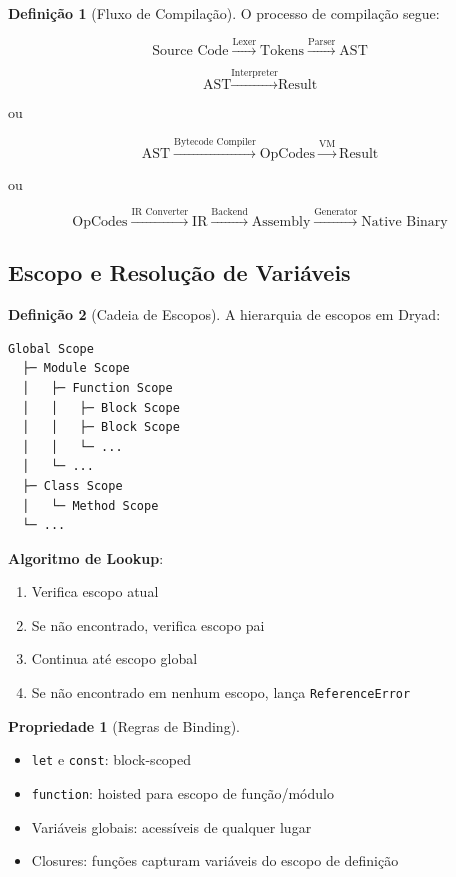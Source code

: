 \documentclass[12pt,a4paper]{article}
\theoremstyle{definition}
\newtheorem{definition}{Definição}[section]
\newtheorem{property}{Propriedade}[section]
\begin{document}
\begin{definition}[Fluxo de Compilação]
O processo de compilação segue:

\[
\text{Source Code} \xrightarrow{\text{Lexer}} \text{Tokens} \xrightarrow{\text{Parser}} \text{AST}
\]

\[
\text{AST} \xrightarrow{\text{Interpreter}} \text{Result}
\]

ou

\[
\text{AST} \xrightarrow{\text{Bytecode Compiler}} \text{OpCodes} \xrightarrow{\text{VM}} \text{Result}
\]

ou

\[
\text{OpCodes} \xrightarrow{\text{IR Converter}} \text{IR} \xrightarrow{\text{Backend}} \text{Assembly} \xrightarrow{\text{Generator}} \text{Native Binary}
\]
\end{definition}

\subsection{Escopo e Resolução de Variáveis}

\begin{definition}[Cadeia de Escopos]
A hierarquia de escopos em Dryad:

\begin{verbatim}
Global Scope
  ├─ Module Scope
  │   ├─ Function Scope
  │   │   ├─ Block Scope
  │   │   ├─ Block Scope
  │   │   └─ ...
  │   └─ ...
  ├─ Class Scope
  │   └─ Method Scope
  └─ ...
\end{verbatim}

\textbf{Algoritmo de Lookup}:
\begin{enumerate}
    \item Verifica escopo atual
    \item Se não encontrado, verifica escopo pai
    \item Continua até escopo global
    \item Se não encontrado em nenhum escopo, lança \texttt{ReferenceError}
\end{enumerate}
\end{definition}

\begin{property}[Regras de Binding]
\begin{itemize}
    \item \texttt{let} e \texttt{const}: block-scoped
    \item \texttt{function}: hoisted para escopo de função/módulo
    \item Variáveis globais: acessíveis de qualquer lugar
    \item Closures: funções capturam variáveis do escopo de definição
\end{itemize}
\end{property}
\end{document}

